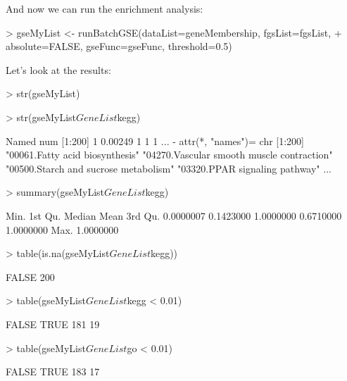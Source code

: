\documentclass[11pt]{article}
\renewenvironment{Schunk}{\vspace{\topsep}}{\vspace{\topsep}}
\begin{document}
And now we can run the enrichment analysis:

\begin{Schunk}
\begin{Sinput}
> gseMyList <- runBatchGSE(dataList=geneMembership, fgsList=fgsList,
+ 				 absolute=FALSE, gseFunc=gseFunc, threshold=0.5)
\end{Sinput}
\end{Schunk}


Let's look at the results:

\begin{Schunk}
\begin{Sinput}
> str(gseMyList)
\end{Sinput}
\begin{Sinput}
> str(gseMyList$GeneList$kegg)
\end{Sinput}
\begin{Soutput}
 Named num [1:200] 1 0.00249 1 1 1 ...
 - attr(*, "names")= chr [1:200] "00061.Fatty acid biosynthesis" "04270.Vascular smooth muscle contraction" "00500.Starch and sucrose metabolism" "03320.PPAR signaling pathway" ...
\end{Soutput}
\begin{Sinput}
> summary(gseMyList$GeneList$kegg)
\end{Sinput}
\begin{Soutput}
     Min.   1st Qu.    Median      Mean   3rd Qu. 
0.0000007 0.1423000 1.0000000 0.6710000 1.0000000 
     Max. 
1.0000000 
\end{Soutput}
\begin{Sinput}
> table(is.na(gseMyList$GeneList$kegg))
\end{Sinput}
\begin{Soutput}
FALSE 
  200 
\end{Soutput}
\begin{Sinput}
> table(gseMyList$GeneList$kegg < 0.01)
\end{Sinput}
\begin{Soutput}
FALSE  TRUE 
  181    19 
\end{Soutput}
\begin{Sinput}
> table(gseMyList$GeneList$go < 0.01)
\end{Sinput}
\begin{Soutput}
FALSE  TRUE 
  183    17 
\end{Soutput}
\end{Schunk}
\end{document}
